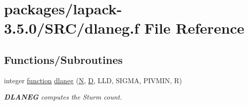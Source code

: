 \hypertarget{dlaneg_8f}{}\section{packages/lapack-\/3.5.0/\+S\+R\+C/dlaneg.f File Reference}
\label{dlaneg_8f}
\subsection*{Functions/\+Subroutines}
\begin{DoxyCompactItemize}
\item 
integer \hyperlink{afunc_8m_a7b5e596df91eadea6c537c0825e894a7}{function} \hyperlink{group__auxOTHERauxiliary_ga4932b5966e6a63f7d7b9f0a189003b6e}{dlaneg} (\hyperlink{polmisc_8c_a0240ac851181b84ac374872dc5434ee4}{N}, \hyperlink{odrpack_8h_a7dae6ea403d00f3687f24a874e67d139}{D}, L\+L\+D, S\+I\+G\+M\+A, P\+I\+V\+M\+I\+N, R)
\begin{DoxyCompactList}\small\item\em {\bfseries D\+L\+A\+N\+E\+G} computes the Sturm count. \end{DoxyCompactList}\end{DoxyCompactItemize}
